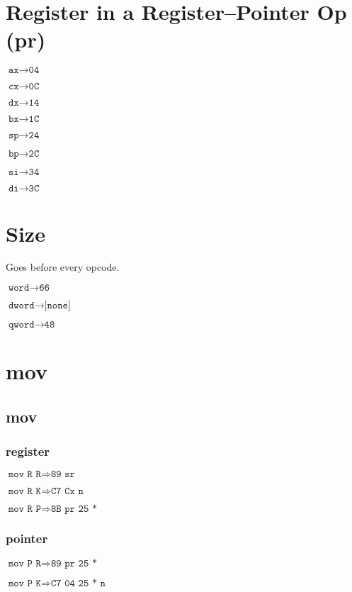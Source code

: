 \documentclass{article}
\begin{document}
\section*{Register in a Register--Pointer Op (pr)}
\begin{minipage}{\textwidth}

$\texttt{ax} \rightarrow \texttt{04}$

$\texttt{cx} \rightarrow \texttt{0C}$

$\texttt{dx} \rightarrow \texttt{14}$

$\texttt{bx} \rightarrow \texttt{1C}$

$\texttt{sp} \rightarrow \texttt{24}$

$\texttt{bp} \rightarrow \texttt{2C}$

$\texttt{si} \rightarrow \texttt{34}$

$\texttt{di} \rightarrow \texttt{3C}$

\end{minipage}


\section*{Size}
\begin{minipage}{\textwidth}

Goes before every opcode.

$\texttt{word} \rightarrow \texttt{66}$

$\texttt{dword} \rightarrow \texttt{[none]}$

$\texttt{qword} \rightarrow \texttt{48}$

\end{minipage}


\section{mov}

\subsection{mov}

\begin{minipage}{\textwidth}

\subsubsection{register}

$\texttt{mov R R} \Rightarrow \texttt{89 sr}$

$\texttt{mov R K} \Rightarrow \texttt{C7 Cx n}$

$\texttt{mov R P} \Rightarrow \texttt{8B pr 25 *}$


\subsubsection{pointer}

$\texttt{mov P R} \Rightarrow \texttt{89 pr 25 *}$

$\texttt{mov P K} \Rightarrow \texttt{C7 04 25 * n}$

\end{minipage}
\end{document}
